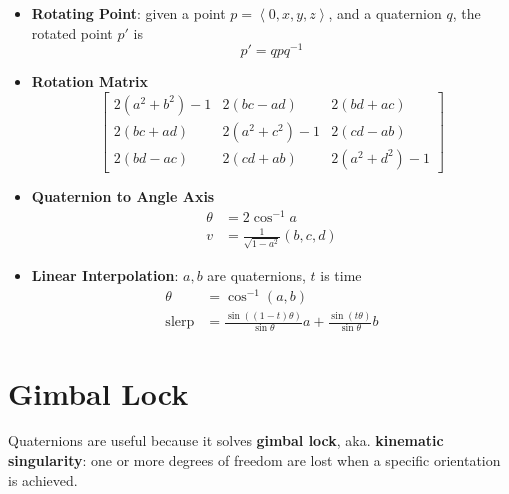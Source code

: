\begin{itemize}
    \item \textbf{Rotating Point}: given a point $ p = \left< 0, x, y, z \right> $,
    and a quaternion $ q $, the rotated point $ p' $ is
    \begin{equation}
      p' = q p q^{-1}
    \end{equation}

    \item \textbf{Rotation Matrix}
    \begin{equation}
      \begin{bmatrix}
        2\left( a^{2} + b^{2} \right) - 1 & 2\left( bc - ad \right) & 2\left( bd + ac \right) \\
        2\left( bc + ad \right) & 2\left( a^{2} + c^{2} \right) - 1 & 2\left( cd - ab \right) \\
        2\left( bd - ac \right) & 2\left( cd + ab \right) & 2\left( a^{2} + d^{2} \right) - 1
      \end{bmatrix}
    \end{equation}

    \item \textbf{Quaternion to Angle Axis}
    \begin{align}
      \theta &= 2 \cos^{-1} a \\
      v &= \frac{1}{\sqrt{1 - a^{2}}} \left( b, c, d \right)
    \end{align}

    \item \textbf{Linear Interpolation}: $ a, b $ are quaternions, $ t $ is time
    \begin{equation}
      \begin{split}
        \theta &= \cos^{-1}\left( a, b \right) \\
        \text{slerp} &= \frac{\sin\left( \left( 1 - t \right) \theta \right)}{\sin\theta} a
        + \frac{\sin\left( t \theta \right)}{\sin\theta} b
      \end{split}
    \end{equation}

  \end{itemize}

\section{Gimbal Lock}

  Quaternions are useful because it solves \textbf{gimbal lock}, aka.
  \textbf{kinematic singularity}: one or more degrees of freedom are lost when
  a specific orientation is achieved.

